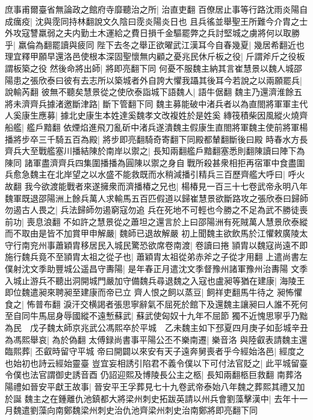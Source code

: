 庶事甫爾臺省無論政之館府寺靡聽治之所|{
	治直吏翻}
百僚居止事等行路沈雨炎陽自成癘疫|{
	沈與霃同持林翻說文久陰曰霃炎陽炎日也}
且兵徭並舉聖王所難今介胄之士外攻寇讐羸弱之夫内勤土木運給之費日損千金驅罷弊之兵討堅城之虜將何以取勝乎|{
	羸倫為翻罷讀與疲同}
陛下去冬之舉正欲曜武江漢耳今自春幾夏|{
	幾居希翻近也}
理宜釋甲願早還洛邑使根本深固聖懷無内顧之憂兆民休斤板之役|{
	斤謂斧斤之役板謂板築之役}
然後命將出師|{
	將即亮翻下同}
何憂不服魏主納其言崔慧景以魏人城邵陽患之張欣泰曰彼有去志所以築城者外自誇大懼我躡其後耳今若說之以兩願罷兵|{
	說輸芮翻}
彼無不聽矣慧景從之使欣泰詣城下語魏人|{
	語牛倨翻}
魏主乃還濟淮餘五將未濟齊兵據渚邀斷津路|{
	斷下管翻下同}
魏主募能破中渚兵者以為直閤將軍軍主代人奚康生應募|{
	據北史康生本姓達奚魏孝文改複姓於是姓奚}
縳筏積柴因風縱火燒齊船艦|{
	艦戶黯翻}
依煙焰進飛刀亂斫中渚兵遂潰魏主假康生直閤將軍魏主使前將軍楊播將步卒三千騎五百為殿|{
	將步即亮翻騎奇寄翻下同殿都輦翻斷後曰殿}
時春水方長齊兵大至戰艦塞川播結陳於南岸以禦之|{
	長知兩翻艦戶黯翻塞悉則翻陳讀曰陣下為陳同}
諸軍盡濟齊兵四集圍播播為圓陳以禦之身自戰所殺甚衆相拒再宿軍中食盡圍兵愈急魏主在北岸望之以水盛不能救既而水稍減播引精兵三百歷齊艦大呼曰|{
	呼火故翻}
我今欲渡能戰者來遂擁衆而濟播椿之兄也|{
	楊椿見一百三十七卷武帝永明八年}
魏軍既退邵陽洲上餘兵萬人求輸馬五百匹假道以歸崔慧景欲斷路攻之張欣泰曰歸師勿遏古人畏之|{
	兵法歸師勿遏窮寇勿追}
兵在死地不可輕也今勝之不足為武不勝徒喪前功|{
	喪息浪翻}
不如許之慧景從之蕭坦之還言於上曰邵陽洲有死賊萬人慧景欣泰縱而不取由是皆不加賞甲申解嚴|{
	魏師已退故解嚴}
初上聞魏主欲飲馬於江懼敕廣陵太守行南兖州事蕭穎胄移居民入城民驚恐欲席卷南渡|{
	卷讀曰捲}
頴胄以魏寇尚遠不即施行魏兵竟不至頴胄太祖之從子也|{
	蕭穎胄太祖從弟赤斧之子從才用翻}
上遣尚書左僕射沈文季助豐城公遥昌守夀陽|{
	是年春正月遣沈文季督豫州諸軍豫州治夀陽}
文季入城止游兵不聽出洞開城門嚴加守備魏兵尋退魏之入寇也盧昶等猶在建康|{
	海陵王即位魏遣昶來聘昶至建康而帝已立}
齊人恨之飼以蒸豆|{
	飼祥吏翻馬牛待之}
昶怖懼食之|{
	怖普布翻}
淚汗交横謁者張思寧辭氣不屈死於館下及還魏主讓昶曰人誰不死何至自同牛馬屈身辱國縱不遠慙蘇武|{
	蘇武使匈奴十九年不屈節}
獨不近愧思寧乎乃黜為民　戊子魏太師京兆武公馮熙卒於平城　乙未魏主如下邳夏四月庚子如彭城辛丑為馮熙舉哀|{
	為於偽翻}
太傅録尚書事平陽公丕不樂南遷|{
	樂音洛}
與陸叡表請魏主還臨熙葬|{
	丕叡時留守平城}
帝曰開闢以來安有天子遠奔舅喪者乎今經始洛邑|{
	經度之也始初也詩云經始靈臺}
豈宜妄相誘引陷君不義令僕以下可付法官貶之|{
	此平城留臺令僕也法官謂御史誘音酉}
仍詔迎熙及博陵長公主之柩|{
	長知兩翻柩巨救翻}
南葬洛陽禮如晉安平獻王故事|{
	晉安平王孚葬見七十九卷武帝泰始八年魏之葬熙其禮又加於誕}
魏主之在鍾離仇池鎮都大將梁州刺史拓跋英請以州兵會劉藻擊漢中|{
	去年十一月魏遣劉藻向南鄭魏梁州刺史治仇池齊梁州刺史治南鄭將即亮翻下同}
